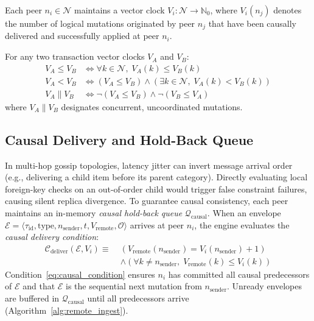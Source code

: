 \begin{definition}
Each peer $n_i \in \mathcal{N}$ maintains a vector clock $V_i: \mathcal{N} \to \mathbb{N}_0$, where $V_i(n_j)$ denotes the number of logical mutations originated by peer $n_j$ that have been causally delivered and successfully applied at peer $n_i$.
\end{definition}

\begin{definition}
For any two transaction vector clocks $V_A$ and $V_B$:
\begin{equation}
\label{eq:causal_relations}
\begin{aligned}
V_A \le V_B &\iff \forall k \in \mathcal{N}, \; V_A(k) \le V_B(k) \\
V_A < V_B &\iff (V_A \le V_B) \land (\exists k \in \mathcal{N}, \; V_A(k) < V_B(k)) \\
V_A \parallel V_B &\iff \neg(V_A \le V_B) \land \neg(V_B \le V_A)
\end{aligned}
\end{equation}
where $V_A \parallel V_B$ designates concurrent, uncoordinated mutations.
\end{definition}

\subsection{Causal Delivery and Hold-Back Queue}
\label{sec:causal-delivery}

In multi-hop gossip topologies, latency jitter can invert message arrival order (e.g., delivering a child item before its parent category). Directly evaluating local foreign-key checks on an out-of-order child would trigger false constraint failures, causing silent replica divergence. To guarantee causal consistency, each peer maintains an in-memory \textit{causal hold-back queue} $\mathcal{Q}_{\text{causal}}$. When an envelope $\mathcal{E} = \langle \tau_{\text{id}}, \text{type}, n_{\text{sender}}, t, V_{\text{remote}}, \mathcal{O} \rangle$ arrives at peer $n_i$, the engine evaluates the \textit{causal delivery condition}:
\begin{equation}
\label{eq:causal_condition}
\begin{aligned}
\mathcal{C}_{\text{deliver}}(\mathcal{E}, V_i) \equiv \;
& \left( V_{\text{remote}}(n_{\text{sender}}) = V_i(n_{\text{sender}}) + 1 \right) \\
& \land \left( \forall k \neq n_{\text{sender}}, \; V_{\text{remote}}(k) \le V_i(k) \right)
\end{aligned}
\end{equation}
Condition~\eqref{eq:causal_condition} ensures $n_i$ has committed all causal predecessors of $\mathcal{E}$ and that $\mathcal{E}$ is the sequential next mutation from $n_{\text{sender}}$. Unready envelopes are buffered in $\mathcal{Q}_{\text{causal}}$ until all predecessors arrive (Algorithm~\ref{alg:remote_ingest}).

